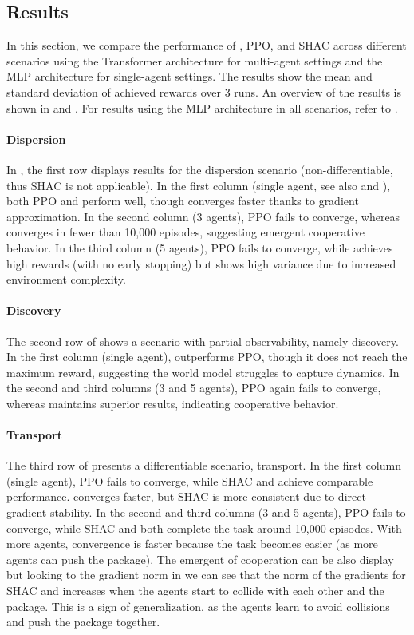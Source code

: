 \subsection{Results}
In this section, we compare the performance of \fname{}, PPO, and SHAC across different scenarios using the Transformer architecture for multi-agent settings and the MLP architecture for single-agent settings. The results show the mean and standard deviation of achieved rewards over 3 runs. An overview of the results is shown in  and . For results using the MLP architecture in all scenarios, refer to .

\paragraph{Dispersion}
In , the first row displays results for the dispersion scenario (non-differentiable, thus SHAC is not applicable). In the first column (single agent, see also  and ), both PPO and \fname{} perform well, though \fname{} converges faster thanks to gradient approximation. In the second column (3 agents), PPO fails to converge, whereas \fname{} converges in fewer than 10,000 episodes, suggesting emergent cooperative behavior. In the third column (5 agents), PPO fails to converge, while \fname{} achieves high rewards (with no early stopping) but shows high variance due to increased environment complexity.

\paragraph{Discovery} 
The second row of  shows a scenario with partial observability, namely discovery. In the first column (single agent), \fname{} outperforms PPO, though it does not reach the maximum reward, suggesting the world model struggles to capture dynamics. In the second and third columns (3 and 5 agents), PPO again fails to converge, whereas \fname{} maintains superior results, indicating cooperative behavior.

\paragraph{Transport}
The third row of  presents a differentiable scenario, transport. In the first column (single agent), PPO fails to converge, while SHAC and \fname{} achieve comparable performance. \fname{} converges faster, but SHAC is more consistent due to direct gradient stability. In the second and third columns (3 and 5 agents), PPO fails to converge, while SHAC and \fname{} both complete the task around 10,000 episodes. With more agents, convergence is faster because the task becomes easier (as more agents can push the package). The emergent of cooperation can be also display but looking to the gradient norm in  we can see that the norm of the gradients for SHAC and \fname{} increases when the agents start to collide with each other and the package. This is a sign of generalization, as the agents learn to avoid collisions and push the package together.

